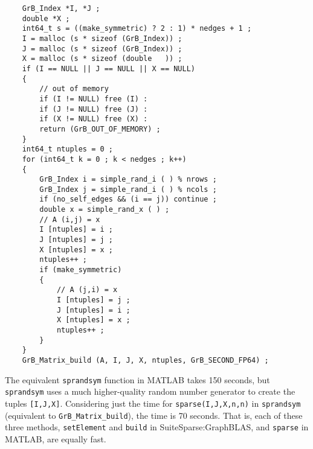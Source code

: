 \documentclass[12pt]{article}
\begin{document}
\newpage
    {\footnotesize
    \begin{verbatim}
    GrB_Index *I, *J ;
    double *X ;
    int64_t s = ((make_symmetric) ? 2 : 1) * nedges + 1 ;
    I = malloc (s * sizeof (GrB_Index)) ;
    J = malloc (s * sizeof (GrB_Index)) ;
    X = malloc (s * sizeof (double   )) ;
    if (I == NULL || J == NULL || X == NULL)
    {
        // out of memory
        if (I != NULL) free (I) :
        if (J != NULL) free (J) :
        if (X != NULL) free (X) :
        return (GrB_OUT_OF_MEMORY) ;
    }
    int64_t ntuples = 0 ;
    for (int64_t k = 0 ; k < nedges ; k++)
    {
        GrB_Index i = simple_rand_i ( ) % nrows ;
        GrB_Index j = simple_rand_i ( ) % ncols ;
        if (no_self_edges && (i == j)) continue ;
        double x = simple_rand_x ( ) ;
        // A (i,j) = x
        I [ntuples] = i ;
        J [ntuples] = j ;
        X [ntuples] = x ;
        ntuples++ ;
        if (make_symmetric)
        {
            // A (j,i) = x
            I [ntuples] = j ;
            J [ntuples] = i ;
            X [ntuples] = x ;
            ntuples++ ;
        }
    }
    GrB_Matrix_build (A, I, J, X, ntuples, GrB_SECOND_FP64) ; \end{verbatim}}

The equivalent \verb'sprandsym' function in MATLAB takes 150 seconds, but
\verb'sprandsym' uses a much higher-quality random number generator to create
the tuples \verb'[I,J,X]'.  Considering just the time for
\verb'sparse(I,J,X,n,n)' in \verb'sprandsym' (equivalent to
\verb'GrB_Matrix_build'), the time is 70 seconds.  That is, each of these three
methods, \verb'setElement' and \verb'build' in SuiteSparse:GraphBLAS, and
\verb'sparse' in MATLAB, are equally fast.


%

\end{document}
